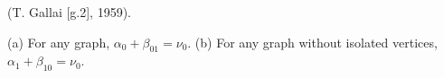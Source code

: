 (T. Gallai [g.2], 1959).

(a) For any graph, $\alpha_0 + \beta_{01} = \nu_0$.
(b) For any graph without isolated vertices, $\alpha_1 + \beta_{10} = \nu_0$.
